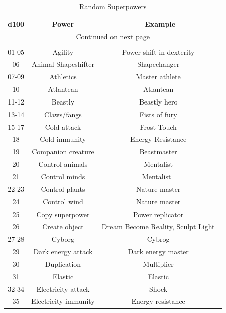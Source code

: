 \begin{longtable}{| c | c | c |}
\caption{Random Superpowers} 
\label{tab:Random Supoerpowers} \\
\hline
\textbf{d100} & \textbf{Power } & \textbf{Example}  \\
\hline
\endhead %

\hline
\multicolumn{3}{|c|}{Continued on next page} \\ \hline
\endfoot %

\hline
\multicolumn{3}{|c|}{End of Table} \\ \hline
\endlastfoot %

01-05 & Agility & Power shift in dexterity \\ \hline
06 & Animal Shapeshifter & Shapechanger \\ \hline
07-09 & Athletics & Master athlete \\ \hline
10 & Atlantean & Atlantean \\ \hline
11-12 & Beastly & Beastly hero \\ \hline
13-14 & Claws/fangs & Fists of fury \\ \hline
15-17 & Cold attack & Frost Touch \\ \hline
18 & Cold immunity & Energy Resistance \\ \hline
19 & Companion creature & Beastmaster \\ \hline
20 & Control animals & Mentalist \\ \hline
21 & Control minds & Mentalist  \\ \hline
22-23 & Control plants & Nature master \\ \hline
24 & Control wind & Nature master \\ \hline
25 & Copy superpower & Power replicator \\ \hline
26 & Create object & Dream Become Reality, Sculpt Light \\ \hline
27-28 & Cyborg & Cybrog \\ \hline
29 & Dark energy attack & Dark energy master \\ \hline
30 & Duplication & Multiplier \\ \hline
31 & Elastic & Elastic \\ \hline
32-34 & Electricity attack & Shock \\ \hline
35 & Electricity immunity & Energy resistance \\ \hline

\end{longtable}

